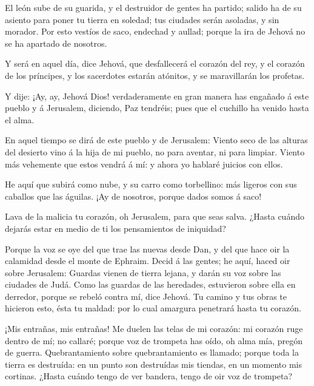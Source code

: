  El león sube de su guarida, y el destruidor de gentes ha
partido; salido ha de su asiento para poner tu tierra en soledad; tus
ciudades serán asoladas, y sin morador.  Por esto vestíos
de saco, endechad y aullad; porque la ira de Jehová no se ha apartado de
nosotros.

 Y será en aquel día, dice Jehová, que desfallecerá el
corazón del rey, y el corazón de los príncipes, y los sacerdotes estarán
atónitos, y se maravillarán los profetas.

 Y dije: ¡Ay, ay, Jehová Dios! verdaderamente en gran
manera has engañado á este pueblo y á Jerusalem, diciendo, Paz tendréis;
pues que el cuchillo ha venido hasta el alma.

 En aquel tiempo se dirá de este pueblo y de Jerusalem:
Viento seco de las alturas del desierto vino á la hija de mi pueblo, no
para aventar, ni para limpiar.  Viento más vehemente que
estos vendrá á mí: y ahora yo hablaré juicios con ellos.

 He aquí que subirá como nube, y su carro como
torbellino: más ligeros con sus caballos que las águilas. ¡Ay de
nosotros, porque dados somos á saco!

 Lava de la malicia tu corazón, oh Jerusalem, para que
seas salva. ¿Hasta cuándo dejarás estar en medio de ti los pensamientos
de iniquidad?

 Porque la voz se oye del que trae las nuevas desde Dan,
y del que hace oir la calamidad desde el monte de Ephraim.
 Decid á las gentes; he aquí, haced oir sobre Jerusalem:
Guardas vienen de tierra lejana, y darán su voz sobre las ciudades de
Judá.  Como las guardas de las heredades, estuvieron
sobre ella en derredor, porque se rebeló contra mí, dice Jehová.
 Tu camino y tus obras te hicieron esto, ésta tu maldad:
por lo cual amargura penetrará hasta tu corazón.

 ¡Mis entrañas, mis entrañas! Me duelen las telas de mi
corazón: mi corazón ruge dentro de mí; no callaré; porque voz de
trompeta has oído, oh alma mía, pregón de guerra. 
Quebrantamiento sobre quebrantamiento es llamado; porque toda la tierra
es destruída: en un punto son destruídas mis tiendas, en un momento mis
cortinas.  ¿Hasta cuándo tengo de ver bandera, tengo de
oir voz de trompeta?

